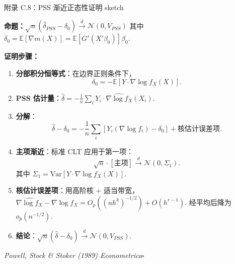 \documentclass[aspectratio=169, 10pt]{beamer}
\begin{document}
\begin{frame}{附录 C.8：PSS 渐近正态性证明 sketch}
  \hypertarget{proof-c8}{}

  \textbf{命题：}$\sqrt{n}(\hat\delta_{PSS} - \delta_0) \overset{d}{\to} \mathcal{N}(0, V_{PSS})$
  其中 $\delta_0 = \mathbb{E}[\nabla m(X)] = \mathbb{E}[G'(X'\beta_0)] \beta_0$.

  \textbf{证明步骤：}
  \begin{enumerate}\setlength{\itemsep}{1pt}
    \item \textbf{分部积分恒等式}：在边界正则条件下，
    $$\delta_0 = -\mathbb{E}[Y \cdot \nabla \log f_X(X)].$$

    \item \textbf{PSS 估计量}：$\hat\delta = -\frac{1}{n}\sum_i Y_i \cdot \widehat{\nabla \log f_X}(X_i)$.

    \item \textbf{分解}：
    $$\hat\delta - \delta_0 = -\frac{1}{n}\sum_i [Y_i (\nabla \log f_i) - \delta_0]
    + \text{核估计误差项}.$$

    \item \textbf{主项渐近}：标准 CLT 应用于第一项：
    $$\sqrt{n} \cdot [\text{主项}] \overset{d}{\to} \mathcal{N}(0, \Sigma_1).$$
    其中 $\Sigma_1 = \text{Var}[Y \cdot \nabla \log f_X(X)]$.

    \item \textbf{核估计误差项}：用高阶核 + 适当带宽，
    $\widehat{\nabla \log f_X} - \nabla \log f_X = O_p((nh^k)^{-1/2}) + O(h^{r-1})$.
    经平均后降为 $o_p(n^{-1/2})$.

    \item \textbf{结论}：$\sqrt{n}(\hat\delta - \delta_0) \overset{d}{\to} \mathcal{N}(0, V_{PSS})$.
  \end{enumerate}

  \hfill{\scriptsize\textit{Powell, Stock \& Stoker (1989) Econometrica}}\quad$\square$
  \hfill{\scriptsize\hyperlink{main-c8}{}}

\end{frame}
\end{document}
